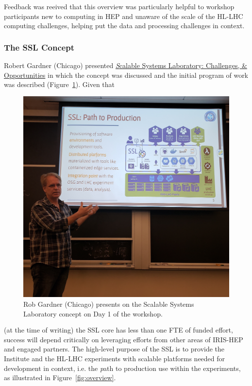 \documentclass[11pt,letterpaper,fleqn]{article}
\begin{document}
Feedback was reeived that this overview was particularly helpful to workshop participants new to computing in HEP and unaware of the scale of the HL-LHC computing challenges, helping put the data and processing challenges in context.

\subsubsection{The SSL Concept}
\vspace{0.2cm}
Robert Gardner (Chicago) presented \href{https://indico.cern.ch/event/820946/contributions/3461590/attachments/1866979/3070394/2019.06.21_SSL_Overview_Rob.pdf}{\textit Scalable Systems Laboratory: Challenges, \& Opportunities} in which the concept was discussed and the initial program of work was described (Figure~\ref{fig:rwg_ssl}). Given that
\begin{figure}
  \includegraphics[width=0.99\linewidth]{figures/rwg_ssl.jpg}
  \caption{Rob Gardner (Chicago) presents on the Scalable Systems Laboratory concept on Day 1 of the workshop.}
  \label{fig:rwg_ssl}
\end{figure}
(at the time of writing) the SSL core has less than one FTE of funded effort, success will depend critically on leveraging efforts from other areas of IRIS-HEP and engaged partners. The high-level purpose of the SSL is to provide the Institute and the HL-LHC experiments with scalable platforms needed for development in context, i.e. the {\textit path to production} use within the experiments, as illustrated in Figure~\ref{fig:overview}.
\end{document}
